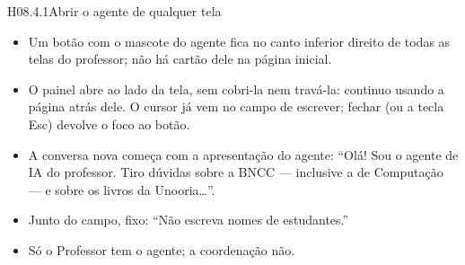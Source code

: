 \begin{historia}{H08.4.1}{Abrir o agente de qualquer tela}{\parcial}
\aceite
\begin{itemize}
  \item Um botão com o mascote do agente fica no canto inferior direito de todas
    as telas do professor; não há cartão dele na página inicial.
  \item O painel abre ao lado da tela, sem cobri-la nem travá-la: continuo
    usando a página atrás dele. O cursor já vem no campo de escrever; fechar (ou
    a tecla Esc) devolve o foco ao botão.
  \item A conversa nova começa com a apresentação do agente: \enquote{Olá! Sou o
    agente de IA do professor. Tiro dúvidas sobre a BNCC --- inclusive a de
    Computação --- e sobre os livros da Unooria\ldots}.
  \item Junto do campo, fixo: \enquote{Não escreva nomes de estudantes.}
  \item Só o Professor tem o agente; a coordenação não.
\end{itemize}
\end{historia}

